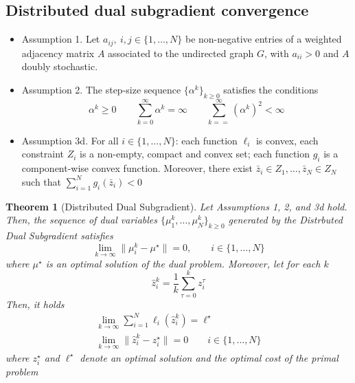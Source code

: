 \documentclass{book}
\theoremstyle{theoremv2}
\newtheorem{theorem}{Theorem}[chapter]
\theoremstyle{defv2}
\theoremstyle{remark}
\theoremstyle{remark}
\theoremstyle{definition}
\theoremstyle{definition}
\begin{document}
\subsection{Distributed dual subgradient convergence}
\begin{itemize}
    \item Assumption 1. Let $a_{ij},\ i,j\in\{1,\dots,N\}$ be non-negative entries of a weighted adjacency matrix $A$ associated to the undirected graph $G$, with $a_{ii}>0$ and $A$ doubly stochastic.
    \item Assumption 2. The step-size sequence $\{\alpha^k\}_{k\geq 0}$ satisfies the conditions
        \[
            \alpha^k \geq 0 \qquad \displaystyle\sum_{k=0}^{\infty} \alpha^k = \infty \qquad \displaystyle\sum_{k==}^{\infty} (\alpha^k)^2 < \infty
        \]
    \item Assumption 3d. For all $i\in\{1,\dots,N\}$: each function $\ell_i$ is convex, each constraint $Z_i$ is a non-empty, compact and convex set; each function $g_i$ is a component-wise convex function. Moreover, there exist $\bar{z}_i\in Z_1,\dots, \bar{z}_N\in Z_N$ such that $\sum_{i=1}^{N}g_i(\bar{z}_i)<0$
\end{itemize}
\begin{theorem}[Distributed Dual Subgradient]
    Let Assumptions 1, 2, and 3d hold. Then, the sequence of dual variables $\{\mu_1^k,\dots,\mu_N^k\}_{k\geq 0}$ generated by the Distrbuted Dual Subgradient satisfies 
    \[
        \lim_{k\to\infty} \|\mu_i^k - \mu^\star\| = 0, \qquad i\in\{1,\dots,N\}
    \]
    where $\mu^\star$ is an optimal solution of the dual problem. Moreover, let for each $k$ 
    \[
        \hat{z}_i^k = \displaystyle\frac{1}{k} \displaystyle\sum_{\tau=0}^{k} z_i^\tau
    \]
    Then, it holds 
    \begin{gather*}
        \lim_{k\to\infty} \displaystyle\sum_{i=1}^{N} \ell_i(\hat{z}_i^k) = \ell^\star \\
        \lim_{k\to\infty} \|\hat{z}_i^k - z_i^\star \| = 0 \qquad i\in\{ 1,\dots,N \}
    \end{gather*}
    where $z_i^\star$ and $\ell^\star$ denote an optimal solution and the optimal cost of the primal problem
\end{theorem}
\end{document}
